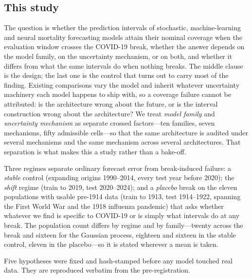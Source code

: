 \subsection{This study}

The question is whether the prediction intervals of stochastic,
machine-learning and neural mortality forecasting models attain their
nominal coverage when the evaluation window crosses the COVID-19 break,
whether the answer depends on the model family, on the uncertainty
mechanism, or on both, and whether it differs from what the same intervals
do when nothing breaks. The middle clause is the design; the last one is
the control that turns out to carry most of the finding. Existing comparisons
vary the model and inherit whatever uncertainty machinery each model happens
to ship with, so a coverage failure cannot be attributed: is the
architecture wrong about the future, or is the interval construction wrong
about the architecture? We treat \emph{model family} and \emph{uncertainty
mechanism} as separate crossed factors---ten families, seven mechanisms,
fifty admissible cells---so that the same architecture is audited under
several mechanisms and the same mechanism across several architectures.
That separation is what makes this a study rather than a bake-off.

Three regimes separate ordinary forecast error from break-induced failure: a
\emph{stable} control (expanding origins 1990--2014, every test year before
2020); the \emph{shift} regime (train to 2019, test 2020--2024); and a
\emph{placebo} break on the eleven populations with usable pre-1914 data
(train to 1913, test 1914--1922, spanning the First World War and the 1918
influenza pandemic) that asks whether whatever we find is specific to
COVID-19 or is simply what intervals do at any break. The population count
differs by regime and by family---twenty across the break and sixteen for
the Gaussian process, eighteen and sixteen in the stable control, eleven in
the placebo---so it is stated wherever a mean is taken.

Five hypotheses were fixed and hash-stamped before any model touched real
data. They are reproduced verbatim from the pre-registration.

